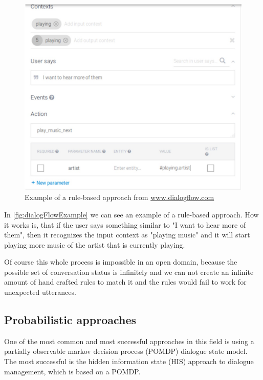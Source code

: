 \documentclass[conference]{IEEEtran}
\begin{document}
\begin{figure}[H]
\centering
   \includegraphics[width=\linewidth]{ruleBasedDialogflow.jpg}
  \caption{Example of a rule-based approach from \url{www.dialogflow.com}}
  \label{fig:dialogFlowExample}
\end{figure}

In \autoref{fig:dialogFlowExample} we can see an example of a rule-based approach. How it works is, that if the user says something similar to "I want to hear more of them", then it recognizes the input context as "playing music" and it will start playing more music of the artist that is currently playing.

Of course this whole process is impossible in an open domain, because the possible set of conversation status is infinitely and we can not create an infinite amount of hand crafted rules to match it and the rules would fail to work for unexpected utterances\cite{wallace2009anatomy}.

\subsection{Probabilistic approaches}
One of the most common and most successful approaches in this field is using a partially observable markov decision process (POMDP)\cite{kaelbling1998planning,young2013pomdp} dialogue state model. The most successful is the hidden information state (HIS) approach to dialogue management\cite{young2007hidden,young2010hidden}, which is based on a POMDP.
\end{document}
